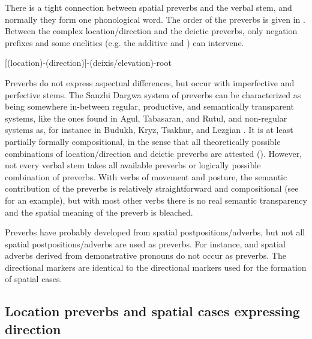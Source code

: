 There is a tight connection between spatial preverbs and the verbal stem, and normally they form one phonological word. The order of the preverbs is given in . Between the complex location/direction and the deictic preverbs, only negation prefixes and some enclitics (e.g. the additive  and  ) can intervene.
%
\begin{exe}
	\ex	\mbox{[(location)-(direction)]-(deixis/elevation)-root}	\label{ex:preverb affixation order}
\end{exe}

Preverbs do not express aspectual differences, but occur with imperfective and perfective stems. The Sanzhi Dargwa system of preverbs can be characterized as being somewhere in-between regular, productive, and semantically transparent systems, like the ones found in Agul, Tabasaran, and Rutul, and non-regular systems as, for instance in Budukh, Kryz, Tsakhur, and Lezgian \citep{Tatevosov2000, Nichols2003, Ganenkov2007}. It is at least partially formally compositional, in the sense that all theoretically possible combinations of location/direction and deictic preverbs are attested (). However, not every verbal stem takes all available preverbs or logically possible combination of preverbs. With verbs of movement and posture, the semantic contribution of the preverbs is relatively straightforward and compositional (see  for an example), but with most other verbs there is no real semantic transparency and the spatial meaning of the preverb is bleached.

Preverbs have probably developed from spatial postpositions/adverbs, but not all spatial postpositions/adverbs are used as preverbs. For instance,   and spatial adverbs derived from demonstrative pronouns do not occur as preverbs. The directional markers are identical to the directional markers used for the formation of spatial cases.



\subsection{Location preverbs and spatial cases expressing direction}
\label{ssec:Location preverbs and spatial cases expressing direction}

